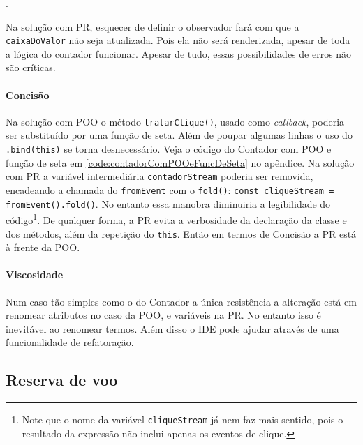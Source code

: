 .

Na solução com PR, esquecer de definir o observador fará com que a
\texttt{caixaDoValor} não seja atualizada.
Pois ela não será renderizada, apesar de toda a lógica do contador
funcionar.
Apesar de tudo, essas possibilidades de erros não são críticas.

\paragraph{Concisão}
\label{sec:org3a4cb87}
Na solução com POO o método \texttt{tratarClique()}, usado como \emph{callback},
poderia ser substituído por uma função de seta.
Além de poupar algumas linhas o uso do \texttt{.bind(this)} se torna
desnecessário.
Veja o código do Contador com POO e função de seta em
\ref{code:contadorComPOOeFuncDeSeta} no apêndice.
Na solução com PR a variável intermediária \texttt{contadorStream} poderia ser
removida, encadeando a chamada do \texttt{fromEvent} com o \texttt{fold()}:
\texttt{const cliqueStream = fromEvent().fold()}.
No entanto essa manobra diminuiria a legibilidade do
código\footnote{Note que o nome da variável \texttt{cliqueStream} já nem faz mais
sentido, pois o resultado da expressão não inclui apenas os eventos de clique.}.
De qualquer forma, a PR evita a verbosidade da declaração da classe e dos
métodos, além da repetição do \texttt{this}.
Então em termos de Concisão a PR está à frente da POO.

\paragraph{Viscosidade}
\label{sec:orgcb6d0e7}
Num caso tão simples como o do Contador a única resistência a alteração
está em renomear atributos no caso da POO, e variáveis na PR.
No entanto isso é inevitável ao renomear termos.
Além disso o IDE pode ajudar através de uma funcionalidade de refatoração.

\subsection{Reserva de voo}
\label{sec:org0b7dd7a}
